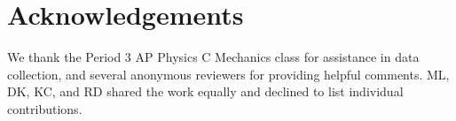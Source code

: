 \documentclass[reprint,amsmath,amssymb,aps,twoside]{revtex4-2}
\begin{document}
\section{Acknowledgements} 
We thank the Period 3 AP Physics C Mechanics class for assistance in data collection, and several anonymous reviewers for providing helpful comments. ML, DK, KC, and RD shared the work equally and declined to list individual contributions. 














\end{document}

